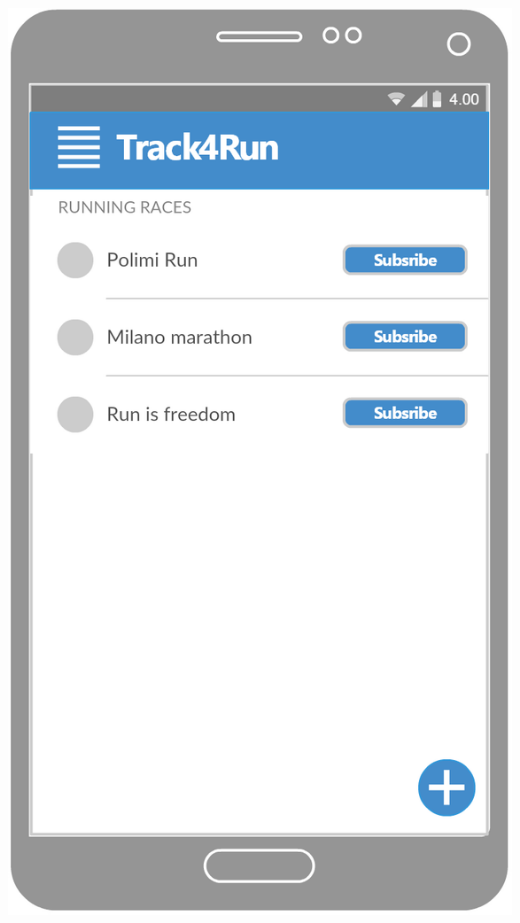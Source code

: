 \begin{center}
\begin{minipage}[c]{.40\textwidth}
\centering
\includegraphics[width=1\textwidth]{Images/userInterface/RaceList}
\end{minipage}%
\hspace{10mm}%
\begin{minipage}[c]{.40\textwidth}
\centering

\end{minipage}
\end{center}

